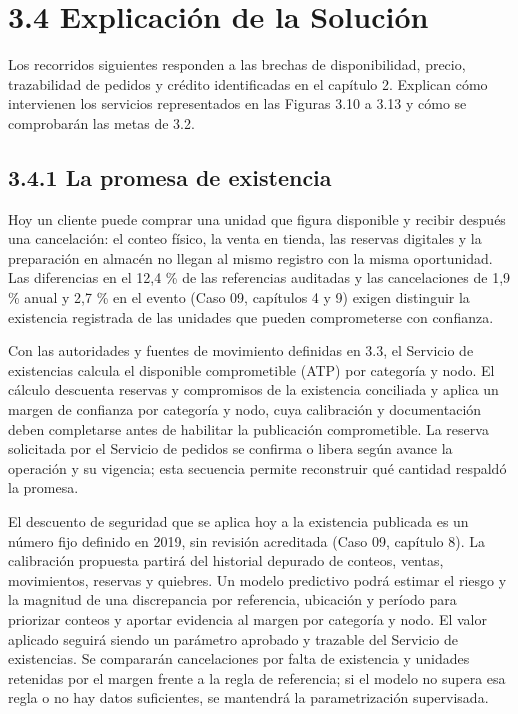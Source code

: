 \documentclass[11pt]{article}
\begin{document}
\section{3.4 Explicación de la Solución}

{Los recorridos siguientes responden a las brechas de disponibilidad, precio, trazabilidad de pedidos y crédito identificadas en el capítulo 2. Explican cómo intervienen los servicios representados en las Figuras 3.10 a 3.13 y cómo se comprobarán las metas de 3.2.}

\subsection{3.4.1 La promesa de existencia}

{Hoy un cliente puede comprar una unidad que figura disponible y recibir después una cancelación: el conteo físico, la venta en tienda, las reservas digitales y la preparación en almacén no llegan al mismo registro con la misma oportunidad. Las diferencias en el 12,4 \% de las referencias auditadas y las cancelaciones de 1,9 \% anual y 2,7 \% en el evento (Caso 09, capítulos 4 y 9) exigen distinguir la existencia registrada de las unidades que pueden comprometerse con confianza.}

{Con las autoridades y fuentes de movimiento definidas en 3.3, el Servicio de existencias calcula el disponible comprometible (ATP) por categoría y nodo. El cálculo descuenta reservas y compromisos de la existencia conciliada y aplica un margen de confianza por categoría y nodo, cuya calibración y documentación deben completarse antes de habilitar la publicación comprometible. La reserva solicitada por el Servicio de pedidos se confirma o libera según avance la operación y su vigencia; esta secuencia permite reconstruir qué cantidad respaldó la promesa.}

{El descuento de seguridad que se aplica hoy a la existencia publicada es un número fijo definido en 2019, sin revisión acreditada (Caso 09, capítulo 8). La calibración propuesta partirá del historial depurado de conteos, ventas, movimientos, reservas y quiebres. Un modelo predictivo podrá estimar el riesgo y la magnitud de una discrepancia por referencia, ubicación y período para priorizar conteos y aportar evidencia al margen por categoría y nodo. El valor aplicado seguirá siendo un parámetro aprobado y trazable del Servicio de existencias. Se compararán cancelaciones por falta de existencia y unidades retenidas por el margen frente a la regla de referencia; si el modelo no supera esa regla o no hay datos suficientes, se mantendrá la parametrización supervisada.}
\end{document}
